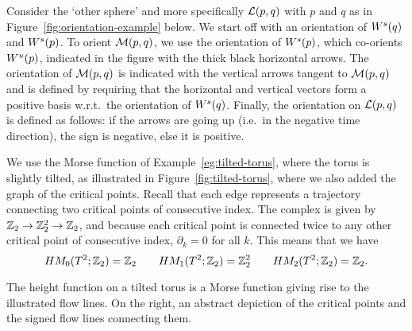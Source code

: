     \begin{eg}
        Consider the `other sphere' and more specifically $\L pq$ with $p$ and  $q$ as in Figure~\ref{fig:orientation-example} below. 
        We start off with an orientation of $\stable q$ and  $\stable p$.
        To orient  $\traj pq$, we use the orientation of  $\stable p$, which co-orients $\unstable p$, indicated in the figure with the thick black horizontal arrows.
        The orientation of $\traj pq$ is indicated with the vertical arrows tangent to  $\traj pq$ and is defined by requiring that the horizontal and vertical vectors form a positive basis w.r.t.\ the orientation of  $\stable q$.
        Finally, the orientation on $\L pq$ is defined as follows: if the arrows are going up (i.e.\ in the negative time direction), the sign is negative, else it is positive.
        \begin{figure}[H]
    \centering
\end{figure}
    \end{eg}
    \filbreak
\begin{eg}
    We use the Morse function of Example~\ref{eg:tilted-torus}, where the torus is slightly tilted, as illustrated in Figure~\ref{fig:tilted-torus}, where we also added the graph of the critical points.
    Recall that each edge represents a trajectory connecting two critical points of consecutive index.
    The complex is given by $ \Z_2 \to  \Z_2^2 \to \Z_2$, and because each critical point is connected twice to any other critical point of consecutive index, $\partial_k = 0$ for all $k$. 
    This means that we have
    \[
        \HMf[0]{T^2; \Z_2} = \Z_2 \qquad
        \HMf[1]{T^2; \Z_2} = \Z_2^2 \qquad
        \HMf[2]{T^2; \Z_2} = \Z_2
    .\] 
\end{eg}
\begin{marginfigure}
    \centering
    \caption{The height function on a tilted torus is a Morse function giving rise to the illustrated flow lines.
        On the right, an abstract depiction of the critical points and the signed flow lines connecting them.
    }

    \label{fig:tilted-torus}
\end{marginfigure}
